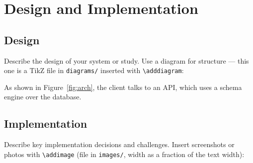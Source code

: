 \chapter{Design and Implementation}
\label{ch:design}

\section{Design}
Describe the design of your system or study. Use a diagram for structure — this
one is a TikZ file in \texttt{diagrams/} inserted with \verb|\adddiagram|:


As shown in Figure~\ref{fig:arch}, the client talks to an API, which uses a
schema engine over the database.

\section{Implementation}
Describe key implementation decisions and challenges. Insert screenshots or
photos with \verb|\addimage| (file in \texttt{images/}, width as a fraction of
the text width):

